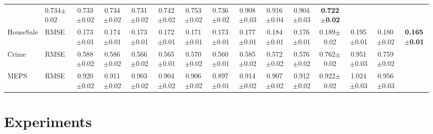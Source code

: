 \documentclass[sigconf, nonacm]{acmart}
\newcommand{\sydesi}[1]{{\color{black}#1}}
\newcommand{\syadd}[1]{{\color{black}#1}}
\newcommand{\syfix}[1]{{\color{black}#1}}
\newcommand{\syne}[1]{{\color{black}#1}}
\begin{document}
\begin{table}
{\begin{tabular}{l l c c c c c c c c c c c c c}
        & \syfix{0.734$\pm$0.02}
        & \syfix{0.733$\pm$0.02}
        & \syfix{0.734$\pm$0.02}
        & \syfix{0.731$\pm$0.02}
        & \syadd{0.742$\pm$0.02}
        & \sydesi{0.753$\pm$0.02}
        & \sydesi{0.736$\pm$0.02}
        & 0.908$\pm$0.03
        & 0.916$\pm$0.04
        & \syfix{0.904$\pm$0.03}
        & \syadd{\textbf{0.722$\pm$0.02}} \\
      HouseSale
        & RMSE
        & \syne{0.173$\pm$0.01}
        & \syne{0.174$\pm$0.01}
        & \syne{0.173$\pm$0.01}
        & 0.172$\pm$0.01
        & 0.171$\pm$0.01
        & 0.173$\pm$0.01
        & \syadd{0.177$\pm$0.01}
        & \sydesi{0.184$\pm$0.01}
        & \sydesi{0.176$\pm$0.01}
        & 0.189$\pm$0.02
        & 0.195$\pm$0.01
        & \syfix{0.180$\pm$0.02}
        & \textbf{0.165$\pm$0.01} \\
      Crime
        & RMSE
        & \sydesi{0.588$\pm$0.02}
        & \sydesi{0.586$\pm$0.02}
        & \syadd{0.566$\pm$0.02}
        & \sydesi{0.565$\pm$0.01}
        & \sydesi{0.570$\pm$0.02}
        & \sydesi{0.560$\pm$0.01}
        & \syadd{0.585$\pm$0.02}
        & \sydesi{0.572$\pm$0.02}
        & \sydesi{0.576$\pm$0.02}
        & \sydesi{0.762$\pm$0.02}
        & \sydesi{0.951$\pm$0.03}
        & \syfix{0.759$\pm$0.02}
        & \syadd{\sydesi{\textbf{0.557$\pm$0.01}}} \\
      MEPS
        & RMSE
        & \sydesi{0.920$\pm$0.02}
        & \sydesi{0.911$\pm$0.02}
        & \syadd{0.903$\pm$0.02}
        & \sydesi{0.904$\pm$0.02}
        & \sydesi{0.906$\pm$0.02}
        & \sydesi{0.897$\pm$0.01}
        & \syadd{0.914$\pm$0.02}
        & \sydesi{0.907$\pm$0.02}
        & \sydesi{0.912$\pm$0.02}
        & \sydesi{0.922$\pm$0.02}
        & \sydesi{1.024$\pm$0.03}
        & \syfix{0.956$\pm$0.03}
        & \syadd{\sydesi{\textbf{0.889$\pm$0.01}}} \\
      \bottomrule
    \end{tabular}
    }
\end{table}

\section{Experiments}
\end{document}
